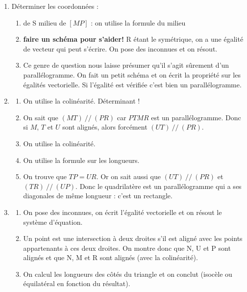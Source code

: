 \documentclass{article}
\begin{document}
\begin{enumerate}
    \item Déterminer les coordonnées : 
    \begin{enumerate}
        \item de S milieu de $[MP]$ : on utilise la formule du milieu 
        \item \textbf{faire un schéma pour s'aider!} R étant le symétrique, on a une égalité de vecteur qui peut s'écrire.
        On pose des inconnues et on résout.
        \item Ce genre de question nous laisse présumer qu'il s'agit sûrement d'un parallélogramme. 
        On fait un petit schéma et on écrit la propriété sur les égalités vectorielle.
        Si l'égalité est vérifiée c'est bien un parallélogramme.
    \end{enumerate}
    \item 
    \begin{enumerate}
        \item On utilise la colinéarité. Déterminant !
        \item On sait que $(MT)\ //\ (PR)$ car $PTMR$ est un parallélogramme. Donc si $M$, $T$ et $U$ sont 
        alignés, alors forcément $(UT)\ //\ (PR)$.
        \item On utilise la colinéarité.
        \item On utilise la formule sur les longueurs.
        \item On trouve que $TP = UR$. Or on sait aussi que $(UT)\ //\ (PR)$ et $(TR)\ //\ (UP)$. Donc le 
        quadrilatère est un parallélogramme qui a ses diagonales de même longueur : c'est un rectangle.
    \end{enumerate}
    \item 
    \begin{enumerate}
        \item On pose des inconnues, on écrit l'égalité vectorielle et on résout le système d'équation.
        \item Un point est une intersection à deux droites s'il est aligné avec les points appartenants à ces 
        deux droites. On montre donc que N, U et P sont alignés et que N, M et R sont alignés (avec la 
        colinéarité).
        \item On calcul les longueurs des côtés du triangle et on conclut (isocèle ou équilatéral en fonction 
        du résultat).
    \end{enumerate}
\end{enumerate}
\end{document}
